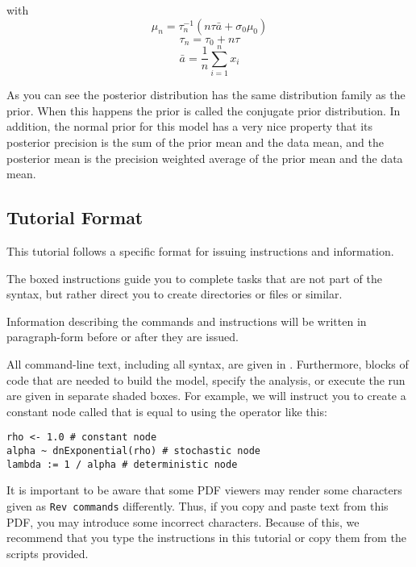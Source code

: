 with
\[ \mu_n = \tau_n^{-1} (n\tau \bar{a} + \sigma_0 \mu_0) \]
   \[\tau_n = \tau_0 + n\tau \]
   \[\bar{a} = \frac{1}{n}\sum_{i=1}^{n} x_i\]

As you can see the posterior distribution has the same distribution family as the prior. When this happens the prior is called the conjugate prior distribution. In addition, the normal prior for this model has a very nice property that its posterior precision is the sum of the prior mean and the data mean, and the posterior mean is the precision weighted average of the prior mean and the data mean.


\medskip
\subsection{Tutorial Format}\label{subsect:Exercise-Format}

This tutorial follows a specific format for issuing instructions and information.

{\begin{framed}
The boxed instructions guide you to complete tasks that are not part of the \RevBayes syntax, but rather direct you to create directories or files or similar.
\end{framed}}

Information describing the commands and instructions will be written in paragraph-form before or after they are issued.

All command-line text, including all \Rev syntax, are given in . 
Furthermore, blocks of \Rev code that are needed to build the model, specify the analysis, or execute the run are given in separate shaded boxes.
For example, we will instruct you to create a constant node called  that is equal to  using the \cl{<-} operator like this:
{\tt \begin{snugshade*}
\begin{lstlisting}
rho <- 1.0 # constant node
alpha ~ dnExponential(rho) # stochastic node
lambda := 1 / alpha # deterministic node
\end{lstlisting}
\end{snugshade*}}

It is important to be aware that some PDF viewers may render some characters given as \colorbox{shadecolor}{\tt{Rev commands}} differently. 
Thus, if you copy and paste text from this PDF, you may introduce some incorrect characters. 
Because of this, we recommend that you type the instructions in this tutorial or copy them from the scripts provided. 


